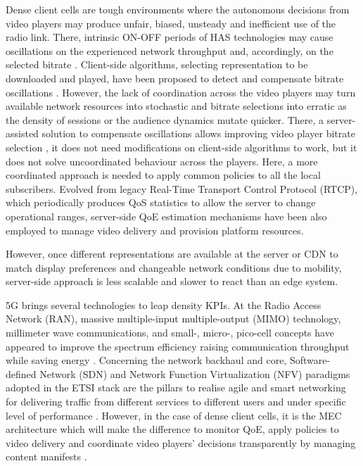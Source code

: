 Dense client cells are tough environments where the autonomous decisions from video players may produce unfair, biased, unsteady and inefficient use of the radio link. There, intrinsic ON-OFF periods of HAS technologies may cause oscillations on the experienced network throughput and, accordingly, on the selected bitrate \cite{akhshabi2012}. Client-side algorithms, selecting representation to be downloaded and played, have been proposed to detect and compensate bitrate oscillations \cite{mueller2015}. However, the lack of coordination across the video players may turn available network resources into stochastic and bitrate selections into erratic as the density of sessions or the audience dynamics mutate quicker. There, a server-assisted solution to compensate oscillations allows improving video player bitrate selection \cite{akhshabi2013}, it does not need modifications on client-side algorithms to work, but it does not solve uncoordinated behaviour across the players. Here, a more coordinated approach is needed to apply common policies to all the local subscribers. Evolved from legacy Real-Time Transport Control Protocol (RTCP), which periodically produces QoS statistics to allow the server to change operational ranges, server-side QoE estimation mechanisms \cite{koskimies2017} have been also employed to manage video delivery and provision platform resources.

However, once different representations are available at the server or CDN to match display preferences and changeable network conditions due to mobility, server-side approach is less scalable and slower to react than an edge system.

5G brings several technologies to leap density KPIs. At the Radio Access Network (RAN), massive multiple-input multiple-output (MIMO) technology, millimeter wave communications, and \hbox{small-,} \hbox{micro-,} \hbox{pico-cell} concepts have appeared to improve the spectrum efficiency raising communication throughput while saving energy \cite{ge20165g}. Concerning the network backhaul and core, Software-defined Network (SDN) and Network Function Virtualization (NFV) paradigms adopted in the ETSI stack are the pillars to realise agile and smart networking for delivering traffic from different services to different users and under specific level of performance \cite{quadri2018}. However, in the case of dense client cells, it is the MEC architecture which will make the difference to monitor QoE, apply policies to video delivery and coordinate video players' decisions transparently by managing content manifests \cite{fajardo2015}.


